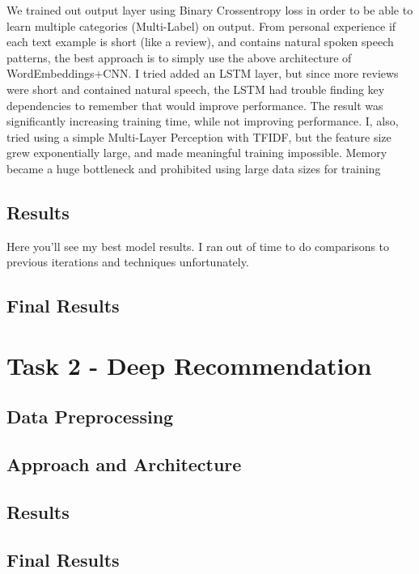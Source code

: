 \documentclass{article}
\begin{document}
We trained out output layer using Binary Crossentropy loss in order to be able to learn multiple categories (Multi-Label) on output. From personal experience if each text example is short (like a review), and contains natural spoken speech patterns, the best approach is to simply use the above architecture of WordEmbeddings+CNN. I tried added an LSTM layer, but since more reviews were short and contained natural speech, the LSTM had trouble finding key dependencies to remember that would improve performance. The result was significantly increasing training time, while not improving performance. I, also, tried using a simple Multi-Layer Perception with TFIDF, but the feature size grew exponentially large, and made meaningful training impossible. Memory became a huge bottleneck and prohibited using large data sizes for training

\subsection*{Results}

Here you'll see my best model results. I ran out of time to do comparisons to previous iterations and techniques unfortunately. 



\subsection*{Final Results}

\section*{Task 2 - Deep Recommendation}

\subsection*{Data Preprocessing}

\subsection*{Approach and Architecture}

\subsection*{Results}

\subsection*{Final Results}

\medskip



\end{document}
